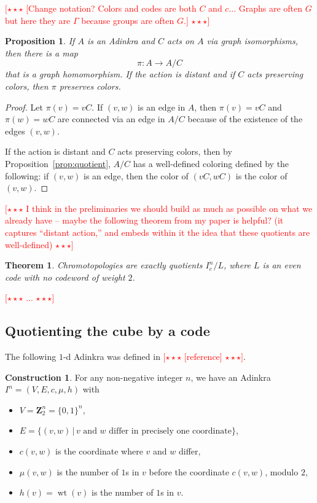 \documentclass[12pt,twoside,singlespace]{article}
\numberwithin{equation}{section}
\newtheorem{thm}[equation]{Theorem}
\newtheorem{prop}[equation]{Proposition}
\theoremstyle{definition}
\newtheorem{construction}[equation]{Construction}
\newcommand{\ZZ}{\mathbf{Z}}
\newcommand{\on}{\operatorname}
\newcommand{\wt}{\on{wt}}
\newcommand{\com}[1]{\textcolor{red}{$[\star \star \star$ #1 $\star \star \star]$}}
\begin{document}
\com{[Change notation?  Colors and codes are both $C$ and $c$...  Graphs are often $G$ but here they are $\Gamma$ because groups are often $G$.]}

\begin{prop}
If $A$ is an Adinkra and $C$ acts on $A$ via graph isomorphisms, then there is a map
\[\pi:A\to A/C\]
 that is a graph homomorphism.  If the action is distant and if $C$ acts preserving colors, then $\pi$ preserves colors.
\end{prop}
\begin{proof}
Let $\pi(v)=vC$.  If $(v,w)$ is an edge in $A$, then $\pi(v)=vC$ and $\pi(w)=wC$ are connected via an edge in $A/C$ because of the existence of the edges $(v,w)$.

If the action is distant and $C$ acts preserving colors, then by Proposition~\ref{prop:quotient}, $A/C$ has a well-defined coloring defined by the following: if $(v,w)$ is an edge, then the color of $(vC,wC)$ is the color of $(v,w)$.
\end{proof}

\com{I think in the preliminaries we should build as much as possible on what we already have -- maybe the following theorem from my paper is helpful? (it captures ``distant action,'' and embeds within it the idea that these quotients are well-defined)}

\begin{thm}
\label{thm:chromotopology as quotient}
Chromotopologies are exactly quotients $I^n_c/L$, where $L$ is an even code with no codeword of weight $2$.
\end{thm}
\com{...}

\subsection{Quotienting the cube by a code}



The following $1$-d Adinkra was defined in \com{[reference]}.
\begin{construction}
For any non-negative integer $n$, we have an Adinkra $I^n=(V,E,c,\mu,h)$ with
\begin{itemize}
\item $V=\ZZ_2^n=\{0,1\}^n$,
\item $E=\{(v,w)\,|\,\mbox{$v$ and $w$ differ in precisely one coordinate}\}$,
\item $c(v,w)$ is the coordinate where $v$ and $w$ differ,
\item $\mu(v,w)$ is the number of $1$s in $v$ before the coordinate $c(v,w)$, modulo $2$,
\item $h(v)=\wt(v)$ is the number of $1$s in $v$.
\end{itemize}
\end{construction}
\end{document}
